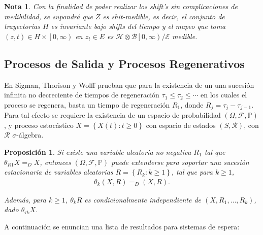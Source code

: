 \documentclass{article}
\newtheorem{Note}{Nota}[section]
\newtheorem{Prop}{Proposición}[section]
\newcommand{\prob}{\mathbb{P}}
\numberwithin{equation}{section}
\begin{document}
\begin{Note}
Con la finalidad de poder realizar los shift's sin complicaciones de medibilidad, se supondr\'a que $Z$ es shit-medible, es decir, el conjunto de trayectorias $H$ es invariante bajo shifts del tiempo y el mapeo que toma $\left(z,t\right)\in H\times\left[0,\infty\right)$ en $z_{t}\in E$ es $\mathcal{H}\otimes\mathcal{B}\left[0,\infty\right)/\mathcal{E}$ medible.
\end{Note}


%
\subsection*{Procesos de Salida y Procesos Regenerativos}
%
En Sigman, Thorison y Wolff \cite{Sigman2} prueban que para la existencia de un una sucesi\'on infinita no decreciente de tiempos de regeneraci\'on $\tau_{1}\leq\tau_{2}\leq\cdots$ en los cuales el proceso se regenera, basta un tiempo de regeneraci\'on $R_{1}$, donde $R_{j}=\tau_{j}-\tau_{j-1}$. Para tal efecto se requiere la existencia de un espacio de probabilidad $\left(\Omega,\mathcal{F},\prob\right)$, y proceso estoc\'astico $\textit{X}=\left\{X\left(t\right):t\geq0\right\}$ con espacio de estados $\left(S,\mathcal{R}\right)$, con $\mathcal{R}$ $\sigma$-\'algebra.

\begin{Prop}
Si existe una variable aleatoria no negativa $R_{1}$ tal que $\theta_{R1}X=_{D}X$, entonces $\left(\Omega,\mathcal{F},\prob\right)$ puede extenderse para soportar una sucesi\'on estacionaria de variables aleatorias $R=\left\{R_{k}:k\geq1\right\}$, tal que para $k\geq1$,
\begin{eqnarray*}
\theta_{k}\left(X,R\right)=_{D}\left(X,R\right).
\end{eqnarray*}

Adem\'as, para $k\geq1$, $\theta_{k}R$ es condicionalmente independiente de $\left(X,R_{1},\ldots,R_{k}\right)$, dado $\theta_{\tau k}X$.

\end{Prop}

A continuaci\'on se enuncian una lista de resultados para sistemas de espera:
\end{document}
